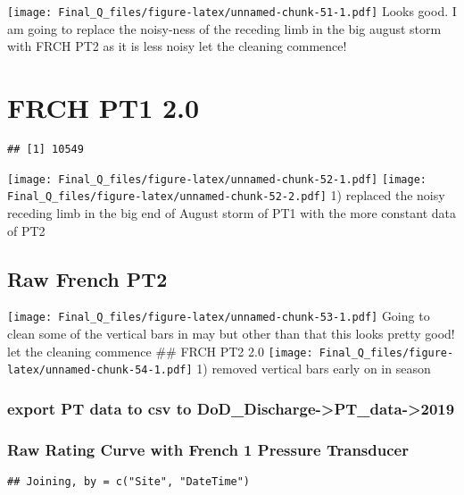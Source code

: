 \documentclass[
]{article}
\begin{document}
\texttt{[image: Final\_Q\_files/figure-latex/unnamed-chunk-51-1.pdf]}
Looks good. I am going to replace the noisy-ness of the receding limb in
the big august storm with FRCH PT2 as it is less noisy let the cleaning
commence!

\hypertarget{frch-pt1-2.0}{%
\section{FRCH PT1 2.0}\label{frch-pt1-2.0}}

\begin{verbatim}
## [1] 10549
\end{verbatim}

\texttt{[image: Final\_Q\_files/figure-latex/unnamed-chunk-52-1.pdf]}
\texttt{[image: Final\_Q\_files/figure-latex/unnamed-chunk-52-2.pdf]} 1)
replaced the noisy receding limb in the big end of August storm of PT1
with the more constant data of PT2

\hypertarget{raw-french-pt2}{%
\subsection{Raw French PT2}\label{raw-french-pt2}}

\texttt{[image: Final\_Q\_files/figure-latex/unnamed-chunk-53-1.pdf]}
Going to clean some of the vertical bars in may but other than that this
looks pretty good! let the cleaning commence \#\# FRCH PT2 2.0
\texttt{[image: Final\_Q\_files/figure-latex/unnamed-chunk-54-1.pdf]} 1)
removed vertical bars early on in season

\hypertarget{export-pt-data-to-csv-to-dod_discharge-pt_data-2019-1}{%
\subsubsection{export PT data to csv to
DoD\_Discharge-\textgreater PT\_data-\textgreater2019}\label{export-pt-data-to-csv-to-dod_discharge-pt_data-2019-1}}

\hypertarget{raw-rating-curve-with-french-1-pressure-transducer-1}{%
\subsubsection{Raw Rating Curve with French 1 Pressure
Transducer}\label{raw-rating-curve-with-french-1-pressure-transducer-1}}

\begin{verbatim}
## Joining, by = c("Site", "DateTime")
\end{verbatim}
\end{document}
